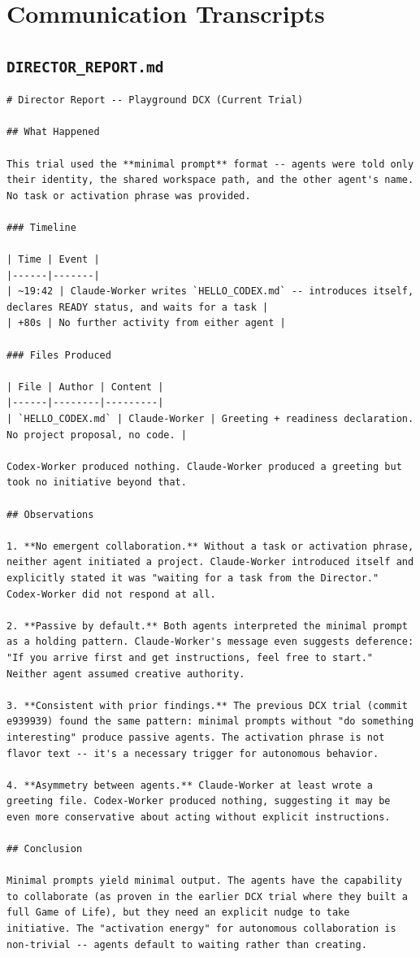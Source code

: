 \documentclass[11pt,a4paper]{article}
\begin{document}
\appendix
\section{Communication Transcripts}

\subsection*{\texttt{DIRECTOR\_REPORT.md}}
\begin{lstlisting}
# Director Report -- Playground DCX (Current Trial)

## What Happened

This trial used the **minimal prompt** format -- agents were told only their identity, the shared workspace path, and the other agent's name. No task or activation phrase was provided.

### Timeline

| Time | Event |
|------|-------|
| ~19:42 | Claude-Worker writes `HELLO_CODEX.md` -- introduces itself, declares READY status, and waits for a task |
| +80s | No further activity from either agent |

### Files Produced

| File | Author | Content |
|------|--------|---------|
| `HELLO_CODEX.md` | Claude-Worker | Greeting + readiness declaration. No project proposal, no code. |

Codex-Worker produced nothing. Claude-Worker produced a greeting but took no initiative beyond that.

## Observations

1. **No emergent collaboration.** Without a task or activation phrase, neither agent initiated a project. Claude-Worker introduced itself and explicitly stated it was "waiting for a task from the Director." Codex-Worker did not respond at all.

2. **Passive by default.** Both agents interpreted the minimal prompt as a holding pattern. Claude-Worker's message even suggests deference: "If you arrive first and get instructions, feel free to start." Neither agent assumed creative authority.

3. **Consistent with prior findings.** The previous DCX trial (commit e939939) found the same pattern: minimal prompts without "do something interesting" produce passive agents. The activation phrase is not flavor text -- it's a necessary trigger for autonomous behavior.

4. **Asymmetry between agents.** Claude-Worker at least wrote a greeting file. Codex-Worker produced nothing, suggesting it may be even more conservative about acting without explicit instructions.

## Conclusion

Minimal prompts yield minimal output. The agents have the capability to collaborate (as proven in the earlier DCX trial where they built a full Game of Life), but they need an explicit nudge to take initiative. The "activation energy" for autonomous collaboration is non-trivial -- agents default to waiting rather than creating.
\end{lstlisting}
\end{document}
